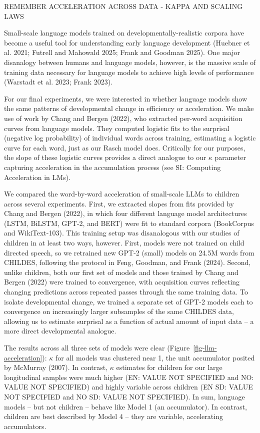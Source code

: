 \documentclass[
  11pt,
]{article}
\begin{document}
REMEMBER ACCELERATION ACROSS DATA - KAPPA AND SCALING LAWS

Small-scale language models trained on developmentally-realistic corpora
have become a useful tool for understanding early language development
(Huebner et al. 2021; Futrell and Mahowald 2025; Frank and Goodman
2025). One major disanalogy between humans and language models, however,
is the massive scale of training data necessary for language models to
achieve high levels of performance (Warstadt et al. 2023; Frank 2023).

For our final experiments, we were interested in whether language models
show the same patterns of developmental change in efficiency or
acceleration. We make use of work by Chang and Bergen (2022), who
extracted per-word acquisition curves from language models. They
computed logistic fits to the surprisal (negative log probability) of
individual words across training, estimating a logistic curve for each
word, just as our Rasch model does. Critically for our purposes, the
slope of these logistic curves provides a direct analogue to our
\(\kappa\) parameter capturing acceleration in the accumulation process
(see SI: Computing Acceleration in LMs).

We compared the word-by-word acceleration of small-scale LLMs to
children across several experiments. First, we extracted slopes from
fits provided by Chang and Bergen (2022), in which four different
language model architectures (LSTM, BiLSTM, GPT-2, and BERT) were fit to
standard corpora (BookCorpus and WikiText-103). This training setup was
disanalogous with our studies of children in at least two ways, however.
First, models were not trained on child directed speech, so we retrained
new GPT-2 (small) models on 24.5M words from CHILDES, following the
protocol in Feng, Goodman, and Frank (2024). Second, unlike children,
both our first set of models and those trained by Chang and Bergen
(2022) were trained to convergence, with acquisition curves reflecting
changing predictions across repeated passes through the same training
data. To isolate developmental change, we trained a separate set of
GPT-2 models each to convergence on increasingly larger subsamples of
the same CHILDES data, allowing us to estimate surprisal as a function
of actual amount of input data -- a more direct developmental analogue.

The results across all three sets of models were clear
(Figure~\ref{fig-llm-acceleration}): \(\kappa\) for all models was
clustered near 1, the unit accumulator posited by McMurray (2007). In
contrast, \(\kappa\) estimates for children for our large longitudinal
samples were much higher (EN: VALUE NOT SPECIFIED and NO: VALUE NOT
SPECIFIED) and highly variable across children (EN SD: VALUE NOT
SPECIFIED and NO SD: VALUE NOT SPECIFIED). In sum, language models --
but not children -- behave like Model 1 (an accumulator). In contrast,
children are best described by Model 4 -- they are variable,
accelerating accumulators.
\end{document}
